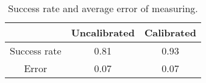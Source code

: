 \begin{table}%
\centering
\begin{tabular}{@{} *3c @{}}
\toprule
&{Uncalibrated} & {Calibrated}\\ 
\midrule
Success rate & 0.81 & 0.93 \\ 
Error & 0.07 & 0.07 \\
\bottomrule 
 \end{tabular}
 \caption{Success rate and average error of measuring.}
\label{table:measuring_overall}
\end{table}